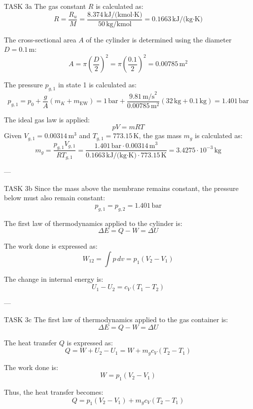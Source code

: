 TASK 3a  
The gas constant \( R \) is calculated as:  
\[
R = \frac{R_u}{M} = \frac{8.374 \, \text{kJ/(kmol·K)}}{50 \, \text{kg/kmol}} = 0.1663 \, \text{kJ/(kg·K)}
\]

The cross-sectional area \( A \) of the cylinder is determined using the diameter \( D = 0.1 \, \text{m} \):  
\[
A = \pi \left(\frac{D}{2}\right)^2 = \pi \left(\frac{0.1}{2}\right)^2 = 0.00785 \, \text{m}^2
\]

The pressure \( p_{g,1} \) in state 1 is calculated as:  
\[
p_{g,1} = p_0 + \frac{g}{A} (m_K + m_{\text{EW}}) = 1 \, \text{bar} + \frac{9.81 \, \text{m/s}^2}{0.00785 \, \text{m}^2} (32 \, \text{kg} + 0.1 \, \text{kg}) = 1.401 \, \text{bar}
\]

The ideal gas law is applied:  
\[
pV = mRT
\]
Given \( V_{g,1} = 0.00314 \, \text{m}^3 \) and \( T_{g,1} = 773.15 \, \text{K} \), the gas mass \( m_g \) is calculated as:  
\[
m_g = \frac{p_{g,1} V_{g,1}}{R T_{g,1}} = \frac{1.401 \, \text{bar} \cdot 0.00314 \, \text{m}^3}{0.1663 \, \text{kJ/(kg·K)} \cdot 773.15 \, \text{K}} = 3.4275 \cdot 10^{-3} \, \text{kg}
\]

---

TASK 3b  
Since the mass above the membrane remains constant, the pressure below must also remain constant:  
\[
p_{g,1} = p_{g,2} = 1.401 \, \text{bar}
\]

The first law of thermodynamics applied to the cylinder is:  
\[
\Delta E = Q - W = \Delta U
\]

The work done is expressed as:  
\[
W_{12} = \int p \, dv = p_1 (V_2 - V_1)
\]

The change in internal energy is:  
\[
U_1 - U_2 = c_V (T_1 - T_2)
\]

---

TASK 3c  
The first law of thermodynamics applied to the gas container is:  
\[
\Delta E = Q - W = \Delta U
\]

The heat transfer \( Q \) is expressed as:  
\[
Q = W + U_2 - U_1 = W + m_g c_V (T_2 - T_1)
\]

The work done is:  
\[
W = p_1 (V_2 - V_1)
\]

Thus, the heat transfer becomes:  
\[
Q = p_1 (V_2 - V_1) + m_g c_V (T_2 - T_1)
\]